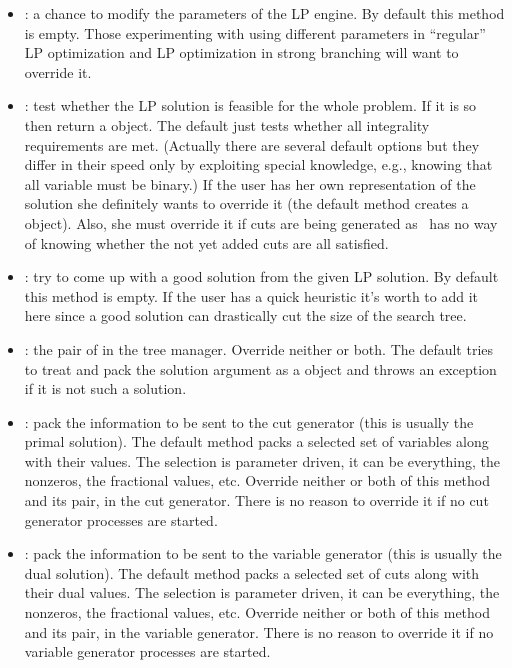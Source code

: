 \begin{itemize}
\item {}: a chance to modify the parameters of the
  LP engine. By default this method is empty. Those experimenting with using
  different parameters in ``regular'' LP optimization and LP optimization in
  strong branching will want to override it.

\item {}: test whether the LP solution is feasible for
  the whole problem. If it is so then return a  object.
  The default just tests whether all integrality requirements are met.
  (Actually there are several default options but they differ in their speed
  only by exploiting special knowledge, e.g., knowing that all variable must
  be binary.) If the user has her own representation of the solution she
  definitely wants to override it (the default method creates a 
   object). Also, she must override it if cuts are
  being generated as \BB\ has no way of knowing whether the not yet added cuts
  are all satisfied.

\item {}: try to come up with a good
  solution 
  from the given LP solution. By default this method is empty. If the user has
  a quick heuristic it's worth to add it here since a good solution can
  drastically cut the size of the search tree. 

\item {}: the pair of
   in the tree manager. Override neither or
  both. The default tries to treat and pack the solution argument as a 
   object and throws an exception if it is not
  such a 
  solution. 
  
\item {}: pack the information to be sent to the
  cut 
  generator (this is usually the primal solution). The default method packs a
  selected set of variables along with their values. The selection is
  parameter driven, it can be everything, the nonzeros, the fractional values,
  etc. Override neither or both of this method and its pair, 
   in the cut generator. There is no reason to
  override it if no cut generator processes are started.

\item {}: pack the information to be sent to the
  variable generator (this is usually the dual solution). The default method
  packs a selected set of cuts along with their dual values. The selection is
  parameter driven, it can be everything, the nonzeros, the fractional values,
  etc. Override neither or both of this method and its pair, 
   in the variable generator. There is no reason
  to override it if no variable generator processes are started.


\end{itemize}
